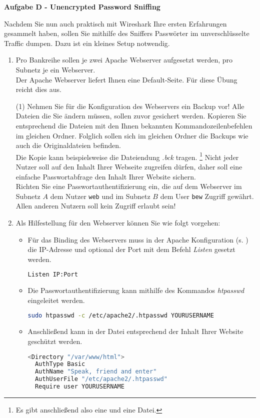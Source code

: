 \documentclass[paper=a4,fontsize=11pt]{scrartcl}%
\begin{document}
\begin{center}
\Large{\textbf{Aufgabe D - Unencrypted Password Sniffing}}
\end{center}\vskip0.25in
Nachdem Sie nun auch praktisch mit Wireshark Ihre ersten Erfahrungen gesammelt haben, sollen Sie mithilfe des Sniffers Passwörter im unverschlüsselte Traffic \glqq dumpen\grqq. Dazu ist ein kleines Setup notwendig.
\begin{enumerate}
	\item Pro Bankreihe sollen je zwei Apache Webserver aufgesetzt werden, pro Subnetz je ein Webserver.\\
	Der Apache Webserver liefert Ihnen eine Default-Seite. Für diese Übung reicht dies aus.
	\begin{tasks}(1)
		\task Nehmen Sie für die Konfiguration des Webservers ein Backup vor! Alle Dateien die Sie ändern müssen, sollen zuvor gesichert werden. Kopieren Sie entsprechend die Dateien mit den Ihnen bekannten Kommandozeilenbefehlen im gleichen Ordner. Folglich sollen sich im gleichen Ordner die Backups wie auch die Originaldateien befinden.\\
	Die Kopie kann beispielsweise die Dateiendung \emph{.bck} tragen. \footnote{Es gibt anschließend also eine  und eine  Datei.}	
		\task Nicht jeder Nutzer soll auf den Inhalt Ihrer Webseite zugreifen dürfen, daher soll eine einfache Passwortabfrage den Inhalt Ihrer Website sichern.\\
	Richten Sie eine Passwortauthentifizierung ein, die auf dem Webserver im Subnetz $A$ dem Nutzer \texttt{web} und im Subnetz $B$ dem User \texttt{bew} Zugriff gewährt. Allen anderen Nutzern soll kein Zugriff erlaubt sein!
	\end{tasks}
	\item Als Hilfestellung für den Webserver können Sie wie folgt vorgehen:
	\begin{itemize}
	\item Für das Binding des Webservers muss in der Apache Konfiguration (s. ) die IP-Adresse und optional der Port mit dem Befehl \emph{Listen} gesetzt werden. 
	\begin{lstlisting}[style=Bash, language=Bash]
Listen IP:Port 
\end{lstlisting} \label{apache}
	\item Die Passwortauthentifizierung kann mithilfe des Kommandos \emph{htpasswd} eingeleitet werden.
\begin{lstlisting}[style=Bash, language=Bash]
sudo htpasswd -c /etc/apache2/.htpasswd YOURUSERNAME
\end{lstlisting} \label{htpasswd}
	\item Anschließend kann in der Datei  entsprechend der Inhalt Ihrer Website geschützt werden.
\begin{lstlisting}[style=Bash, language=Bash]
<Directory "/var/www/html">
  AuthType Basic
  AuthName "Speak, friend and enter"
  AuthUserFile "/etc/apache2/.htpasswd"
  Require user YOURUSERNAME


\end{lstlisting}
\end{itemize}
\end{enumerate}
\end{document}
